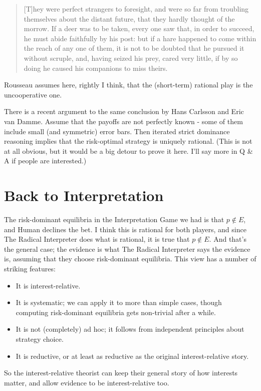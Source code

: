 \begin{quote}

[T]hey were perfect strangers to foresight, and were so far from troubling themselves about the distant future, that they hardly thought of the morrow. If a deer was to be taken, every one saw that, in order to succeed, he must abide faithfully by his post: but if a hare happened to come within the reach of any one of them, it is not to be doubted that he pursued it without scruple, and, having seized his prey, cared very little, if by so doing he caused his companions to miss theirs. 
\end{quote}
Rousseau assumes here, rightly I think, that the (short-term) rational play is the uncooperative one.

There is a recent argument to the same conclusion by Hans Carlsson and Eric van Damme. Assume that the payoffs are not perfectly known - some of them include small (and symmetric) error bars. Then iterated strict dominance reasoning implies that the risk-optimal strategy is uniquely rational. (This is not at all obvious, but it would be a big detour to prove it here. I'll say more in Q \& A if people are interested.)

\section*{Back to Interpretation}
The risk-dominant equilibria in the Interpretation Game we had is that $p \notin E$, and Human declines the bet. I think this is rational for both players, and since The Radical Interpreter does what is rational, it is true that $p \notin E$. And that's the general case; the evidence is what The Radical Interpreter says the evidence is, assuming that they choose risk-dominant equilibria. This view has a number of striking features:

\begin{itemize}
\item It is interest-relative.
\item It is systematic; we can apply it to more than simple cases, though computing risk-dominant equilibria gets non-trivial after a while.
\item It is not (completely) ad hoc; it follows from independent principles about strategy choice.
\item It is reductive, or at least as reductive as the original interest-relative story.
\end{itemize}
So the interest-relative theorist can keep their general story of how interests matter, and allow evidence to be interest-relative too.


